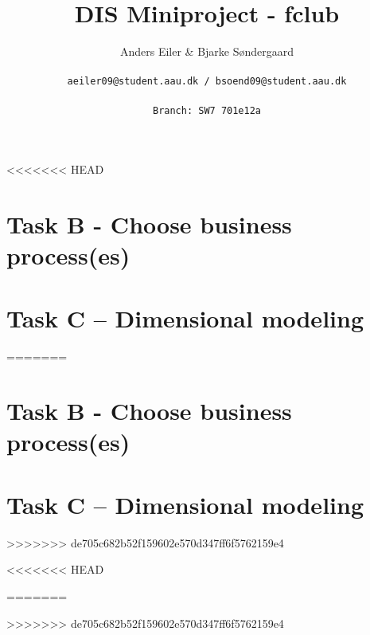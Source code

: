 \documentclass[a4paper,10pt]{article}
\title{DIS Miniproject - fclub}
\author{Anders Eiler \& Bjarke Søndergaard \\
\rule{0pt}{4ex}\texttt{aeiler09@student.aau.dk / bsoend09@student.aau.dk} \\
\rule{0pt}{4ex}\texttt{Branch: SW7 701e12a}}
\begin{document}
    \maketitle
    \newpage


<<<<<<< HEAD
     \section{Task B - Choose business process(es)}
     

     \section{Task C – Dimensional modeling}
     
=======
    \section{Task B - Choose business process(es)}
    

    \section{Task C – Dimensional modeling}
    
>>>>>>> de705c682b52f159602e570d347ff6f5762159e4


<<<<<<< HEAD

=======

>>>>>>> de705c682b52f159602e570d347ff6f5762159e4
\end{document}
